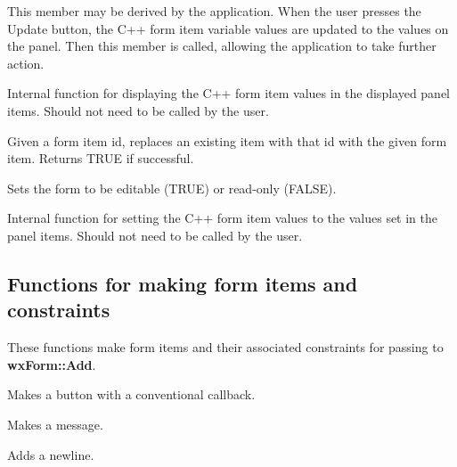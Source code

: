 This member may be derived by the application. When the user presses the
Update button, the C++ form item variable values are updated to the
values on the panel.  Then this member is called, allowing the
application to take further action.



Internal function for displaying the C++ form item values in the
displayed panel items. Should not need to be called by the user.



Given a form item id, replaces an existing item with that id with the
given form item. Returns TRUE if successful.



Sets the form to be editable (TRUE) or read-only (FALSE).



Internal function for setting the C++ form item values to the values set
in the panel items. Should not need to be called by the user.


\subsection{Functions for making form items and constraints}

These functions make form items and their associated constraints for
passing to {\bf wxForm::Add}.


Makes a button with a conventional callback.


Makes a message.


Adds a newline.


